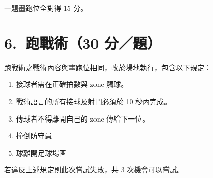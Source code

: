 \documentclass[11pt]{article}
\begin{document}
\noindent
一題畫跑位全對得 15 分。

\section*{6.\ 跑戰術（30 分／題）}

跑戰術之戰術內容與畫跑位相同，改於場地執行，包含以下規定：

\begin{enumerate}
  \item 接球者需在正確拍數與 zone 觸球。
  \item 戰術語言的所有接球及射門必須於 10 秒內完成。
  \item 傳球者不得離開自己的 zone 傳給下一位。
  \item 撞倒防守員
  \item 球離開足球場區
\end{enumerate}

\noindent
若違反上述規定則此次嘗試失敗，共 3 次機會可以嘗試。
\end{document}
